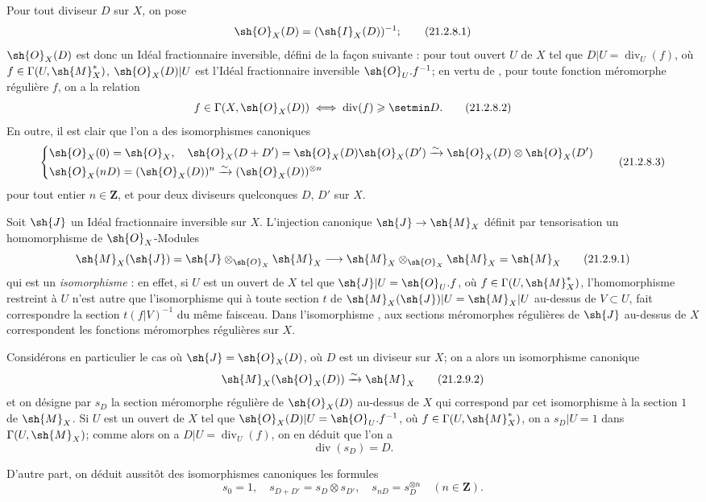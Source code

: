 \begin{env}[21.2.8]
\label{IV.21.2.8}
Pour tout diviseur $D$ sur $X$, on pose
\[
\label{IV.21.2.8.1}
  \sh{O}_X(D)=(\sh{I}_X(D))^{-1};
  \tag{21.2.8.1}
\]
$\sh{O}_X(D)$ est donc un Idéal fractionnaire inversible, défini de la façon suivante : pour tout ouvert $U$ de $X$ tel que $D|U=\operatorname{div}_U(f)$, où $f\in\Gamma(U,\sh{M}_X^*)$, $\sh{O}_X(D)|U$ est l'Idéal
fractionnaire inversible $\sh{O}_U.f^{-1}$;
en vertu de , pour toute fonction méromorphe régulière $f$, on a la relation
\[
\label{IV.21.2.8.2}
  f\in\Gamma(X,\sh{O}_X(D)) \iff \operatorname{div}(f)\geq\setmin D.
  \tag{21.2.8.2}
\]
En outre, il est clair que l'on a des isomorphismes canoniques 
\[
\label{IV.21.2.8.3}
  \left\{\begin{aligned}
    &\sh{O}_X(0)=\sh{O}_X,\quad \sh{O}_X(D+D')=\sh{O}_X(D)\sh{O}_X(D')\xrightarrow{\sim}\sh{O}_X(D)\otimes\sh{O}_X(D')\\
    &\sh{O}_X(nD)=(\sh{O}_X(D))^n\xrightarrow{\sim}(\sh{O}_X(D))^{\otimes n}
  \end{aligned}\right.
  \tag{21.2.8.3}
\]
pour tout entier $n\in\mathbf{Z}$, et pour deux diviseurs quelconques $D$, $D'$ sur $X$.
\end{env}

\begin{env}[21.2.9]
\label{IV.21.2.9}
Soit $\sh{J}$ un Idéal fractionnaire inversible sur $X$.
L'injection canonique $\sh{J}\to\sh{M}_X$ définit par tensorisation un homomorphisme de $\sh{O}_X$-Modules
\[
\label{IV.21.2.9.1}
  \sh{M}_X(\sh{J})=\sh{J}\otimes_{\sh{O}_X}\sh{M}_X\to\sh{M}_X\otimes_{\sh{O}_X}\sh{M}_X=\sh{M}_X
  \tag{21.2.9.1}
\]
qui est un \emph{isomorphisme} : en effet, si $U$ est un ouvert de $X$ tel que $\sh{J}|U=\sh{O}_U.f$, où $f\in\Gamma(U,\sh{M}_X^*)$, l'homomorphisme  restreint à $U$ n'est autre que l'isomorphisme qui à toute section $t$ de $\sh{M}_X(\sh{J})|U=\sh{M}_X|U$ au-dessus de $V\subset U$, fait correspondre la section $t(f|V)^{-1}$ du même faisceau.
Dans l'isomorphisme , aux sections méromorphes régulières de $\sh{J}$ au-dessus de $X$ correspondent les fonctions méromorphes régulières sur $X$.

Considérons en particulier le cas où $\sh{J}=\sh{O}_X(D)$, où $D$ est un diviseur sur $X$;
on a alors un isomorphisme canonique
\[
\label{IV.21.2.9.2}
  \sh{M}_X(\sh{O}_X(D))\xrightarrow{\sim}\sh{M}_X
  \tag{21.2.9.2}
\]
et on désigne par $s_D$ la section méromorphe régulière de $\sh{O}_X(D)$ au-dessus de $X$ qui correspond par cet isomorphisme à la section $1$ de $\sh{M}_X$.
Si $U$ est un ouvert de $X$ tel que $\sh{O}_X(D)|U=\sh{O}_U.f^{-1}$, où $f\in\Gamma(U,\sh{M}_X^*)$, on a $s_D|U=1$ dans $\Gamma(U,\sh{M}_X)$;
comme alors on a $D|U=\operatorname{div}_U(f)$, on en déduit  que l'on a
\[
\label{IV.21.2.9.3}
  \operatorname{div}(s_D)=D.
  \tag{21.2.9.3}
\]

D'autre part, on déduit aussitôt des isomorphismes canoniques  les formules
\[
\label{IV.21.2.9.4}
  s_0=1,\quad s_{D+D'}=s_D\otimes s_{D'},\quad s_{nD}=s_D^{\otimes n}\quad(n\in\mathbf{Z}).
  \tag{21.2.9.4}
\]
\end{env}

